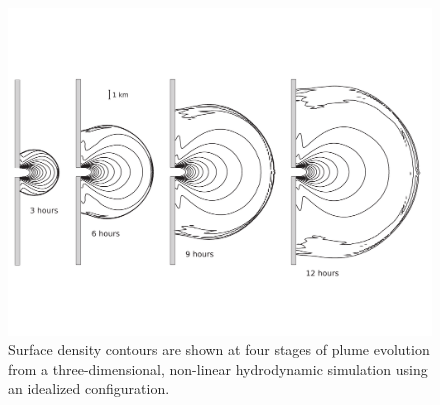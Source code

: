 \documentclass[12pt]{article}
\begin{document}





\clearpage
\listoffigures

\clearpage

\begin{figure}
    \centering
    \includegraphics[width=6in]{Figures/plume_expansion_frames.pdf}
    \caption{Surface density contours are shown at four stages of plume evolution from a three-dimensional, non-linear hydrodynamic simulation using an idealized configuration.}
    \label{fig:3d_expansion}
\end{figure}
\end{document}

